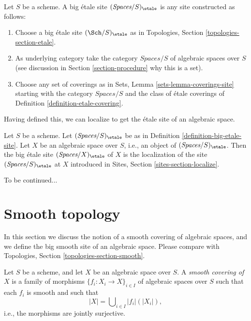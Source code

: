 \begin{definition}
\label{definition-big-etale-site}
Let $S$ be a scheme. A big \'etale site {\it $(\textit{Spaces}/S)_\etale$}
is any site constructed as follows:
\begin{enumerate}
\item Choose a big \'etale site $(\Sch/S)_\etale$ as in
Topologies, Section \ref{topologies-section-etale}.
\item As underlying category take the category $\textit{Spaces}/S$
of algebraic spaces over $S$ (see discussion in
Section \ref{section-procedure} why this is a set).
\item Choose any set of coverings as in
Sets, Lemma \ref{sets-lemma-coverings-site} starting with the
category $\textit{Spaces}/S$ and the class of \'etale coverings
of Definition \ref{definition-etale-covering}.
\end{enumerate}
\end{definition}

\noindent
Having defined this, we can localize to get the \'etale
site of an algebraic space.

\begin{definition}
\label{definition-big-small-etale}
Let $S$ be a scheme. Let $(\textit{Spaces}/S)_\etale$ be as in
Definition \ref{definition-big-etale-site}.
Let $X$ be an algebraic space over $S$, i.e., an object of
$(\textit{Spaces}/S)_\etale$. Then the big \'etale site
{\it $(\textit{Spaces}/X)_\etale$} of $X$
is the localization of the site $(\textit{Spaces}/S)_\etale$
at $X$ introduced in Sites, Section \ref{sites-section-localize}.
\end{definition}

\noindent
To be continued...







\section{Smooth topology}
\label{section-smooth}

\noindent
In this section we discuss the notion of a smooth covering of
algebraic spaces, and we define the big smooth site of an
algebraic space. Please compare with
Topologies, Section \ref{topologies-section-smooth}.

\begin{definition}
\label{definition-smooth-covering}
Let $S$ be a scheme, and let $X$ be an algebraic space over $S$.
A {\it smooth covering of $X$} is a family of morphisms
$\{f_i : X_i \to X\}_{i \in I}$ of algebraic spaces over $S$
such that each $f_i$ is smooth
and such that
$$
|X| = \bigcup\nolimits_{i \in I} |f_i|(|X_i|),
$$
i.e., the morphisms are jointly surjective.
\end{definition}

